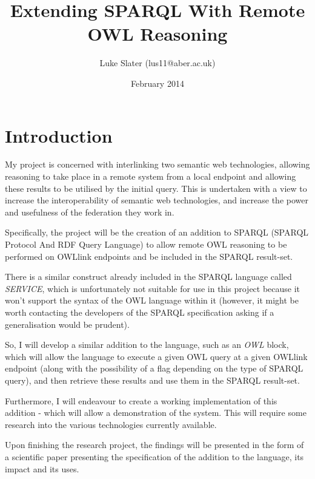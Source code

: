 \documentclass{article}
\begin{document}
\setlength{\parskip}{\medskipamount}
\setlength{\parindent}{0pt}

\title{Extending SPARQL With Remote OWL Reasoning}
\author{Luke Slater (lus11@aber.ac.uk)}
\date{February 2014}

\maketitle

\pagebreak

\section{Introduction}

My project is concerned with interlinking two semantic web technologies,
allowing reasoning to take place in a remote system from a local endpoint and
allowing these results to be utilised by the initial query. This is undertaken
with a view to increase the interoperability of semantic web technologies, and
increase the power and usefulness of the federation they work in.

Specifically, the project will be the creation of an addition to
SPARQL\cite{sparql} (SPARQL Protocol And RDF Query Language) to allow remote
OWL\cite{owlprimer} reasoning to be performed on OWLlink endpoints and be included in the
SPARQL result-set.

There is a similar construct already included in the SPARQL language called
\emph{SERVICE}, which is unfortunately not suitable for use in this project
because it won't support the syntax of the OWL language within it (however, it
might be worth contacting the developers of the SPARQL specification asking if a
generalisation would be prudent).

So, I will develop a similar addition to the language, such as an \emph{OWL}
block, which will allow the language to execute a given OWL query at a given
OWLlink endpoint (along with the possibility of a flag depending on the type of
SPARQL query), and then retrieve these results and use them in the SPARQL
result-set.

Furthermore, I will endeavour to create a working implementation of this
addition - which will allow a demonstration of the system. This will require
some research into the various technologies currently available.

Upon finishing the research project, the findings will be presented in the form
of a scientific paper presenting the specification of the addition to the
language, its impact and its uses.
\end{document}
